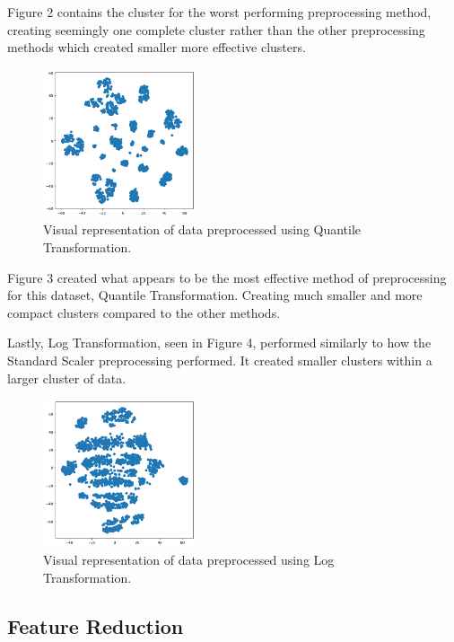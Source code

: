 \documentclass[twocolumn]{article}
\begin{document}
Figure 2 contains the cluster for the worst performing preprocessing method, creating seemingly one complete cluster rather than the other preprocessing methods which created smaller more effective clusters.

\begin{figure}
    \centering
    \includegraphics[width=0.4\textwidth]{images/quantile_transform.png}
    \caption{Visual representation of data preprocessed using Quantile Transformation.}
\end{figure}

Figure 3 created what appears to be the most effective method of preprocessing for this dataset, Quantile Transformation. Creating much smaller and more compact clusters compared to the other methods.

Lastly, Log Transformation, seen in Figure 4, performed similarly to how the Standard Scaler preprocessing performed. It created smaller clusters within a larger cluster of data. 

\begin{figure}
    \centering
    \includegraphics[width=0.4\textwidth]{images/log_transformed.png}
    \caption{Visual representation of data preprocessed using Log Transformation.}
\end{figure}


\subsection{Feature Reduction}
\end{document}
